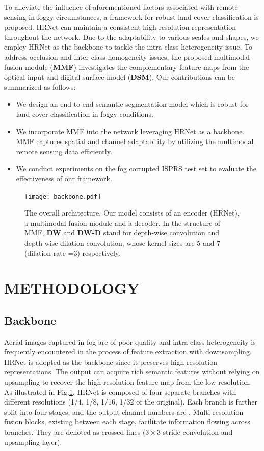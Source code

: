 \documentclass[lettersize,journal]{IEEEtran}
\begin{document}
To alleviate the influence of aforementioned factors associated with remote sensing in foggy circumstances, a framework for robust land cover classification is proposed. HRNet can maintain a consistent high-resolution representation throughout the network. Due to the  adaptability to various scales and shapes, we employ HRNet as the backbone to tackle the intra-class heterogeneity issue. To address occlusion and inter-class homogeneity issues, the proposed multi\-modal fusion module (\textbf{MMF}) investigates the complementary feature maps from the optical input and digital surface model (\textbf{DSM}). Our contributions  can be summarized as follows:
\begin{itemize}
\item We design an end-to-end semantic segmentation model which is robust for land cover classification in foggy conditions.
\item We incorporate MMF into the network leveraging HRNet as a backbone. MMF captures spatial and channel adaptability by utilizing the multimodal remote sensing data efficiently.
\item We conduct experiments on the fog corrupted ISPRS test set to evaluate the effectiveness of our framework.
\end{itemize}
\begin{figure}[!htbp]
    \centering
    \texttt{[image: backbone.pdf]}
    \caption{The overall architecture. Our model consists of an encoder (HRNet), a multimodal fusion module and a decoder. In the structure of MMF, \textbf{DW} and \textbf{DW-D} stand for depth-wise convolution and depth-wise dilation convolution, whose kernel sizes are 5 and 7 (dilation rate =3) respectively.}
    \label{backbone}
    \vspace{-0.2cm}
\end{figure}
\section{METHODOLOGY}
\subsection{Backbone}
Aerial images captured in fog are of poor quality and intra-class heterogeneity is frequently encountered in the process of feature extraction with downsampling. HRNet is adopted as the backbone since it preserves high-resolution representations. The output can acquire rich semantic features without relying on upsampling to recover the high-resolution feature map from the low-resolution.  As illustrated in Fig.\ref{backbone}, HRNet is composed of four separate branches with different resolutions (1/4, 1/8, 1/16, 1/32 of the original). Each branch is further split into four stages, and the output channel numbers are . Multi-resolution fusion blocks,  existing between each stage, facilitate information flowing across branches. They are denoted as crossed lines ($3\times 3$ stride convolution and upsampling layer).
\end{document}
